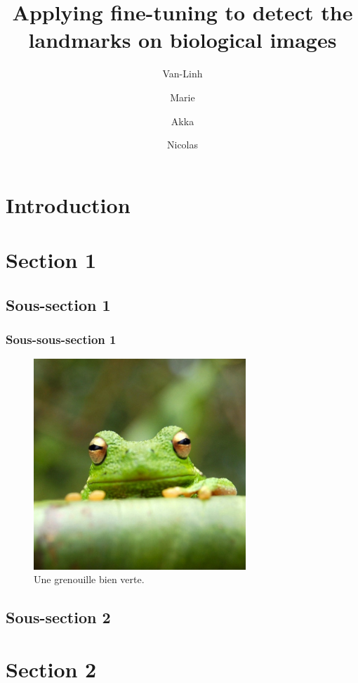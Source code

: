 \documentclass[french]{./sageo}
\title[Fine-tuning for landmarking on biological images]{Applying fine-tuning to detect the landmarks on biological images}
\author[1]{Van-Linh}{Le}
\author[2]{Marie}{Beurton-Aimar}
\author[3]{Akka}{Zemmari}
\author[4]{Nicolas}{Parisey}
\begin{document}
\maketitle

\newpage

\section{Introduction}

\section{Section 1}

\subsection{Sous-section 1}

\subsubsection{Sous-sous-section 1}

\begin{figure}[h]
   \centering  \includegraphics[width=8cm]{images/grenouille.jpg}
  \caption{\label{fig:1} Une grenouille bien verte.}
\end{figure}

\subsection{Sous-section 2}

\section{Section 2}
\end{document}

